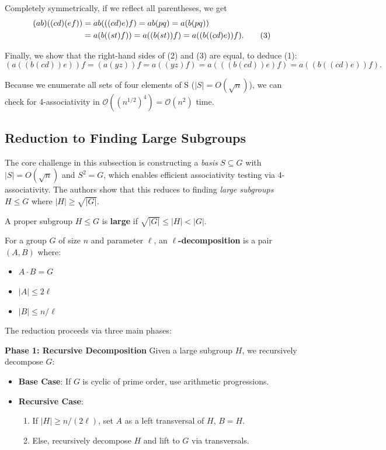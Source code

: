 \documentclass[sigconf]{acmart}
\begin{document}
Completely symmetrically, if we reflect all parentheses, we get
\begin{align}
(ab)((cd)(ef)) &= ab(((cd)e)f) = ab(pq) = a(b(pq)) \notag \\
&= a(b((st)f)) = a((b(st))f) = a((b((cd)e))f). \tag{3}
\end{align}

Finally, we show that the right-hand sides of (2) and (3) are equal, to deduce (1):
\[
(a((b(cd))e))f = (a(yz))f = a((yz)f) = a(((b(cd))e)f) = a((b((cd)e))f).
\]

Because we enumerate all sets of four elements of S ($|S| = O(\sqrt{n})$), we can check for 4-associativity in $\mathcal{O}\left((n^{1/2})^4\right) = \mathcal{O}(n^2)$ time.

\subsection{Reduction to Finding Large Subgroups}
\label{sec:large-subgroups}

The core challenge in this subsection is constructing a \emph{basis} $S \subseteq G$ with $|S| = O(\sqrt{n})$ and $S^2 = G$, which enables efficient associativity testing via 4-associativity. The authors show that this reduces to finding \emph{large subgroups} $H \leq G$ where $|H| \geq \sqrt{|G|}$.

\begin{definition}
A proper subgroup $H \leq G$ is \textbf{large} if $\sqrt{|G|} \leq |H| < |G|$.
\end{definition}

\begin{definition}
For a group $G$ of size $n$ and parameter $\ell$, an \textbf{$\ell$-decomposition} is a pair $(A,B)$ where:
\begin{itemize}
    \item $A \cdot B = G$
    \item $|A| \leq 2\ell$
    \item $|B| \leq n/\ell$
\end{itemize}
\end{definition}

The reduction proceeds via three main phases:

\textbf{Phase 1: Recursive Decomposition}
Given a large subgroup $H$, we recursively decompose $G$:
\begin{itemize}
    \item \textbf{Base Case}: If $G$ is cyclic of prime order, use arithmetic progressions.
    \item \textbf{Recursive Case}:
    \begin{enumerate}
        \item If $|H| \geq n/(2\ell)$, set $A$ as a left transversal of $H$, $B = H$.
        \item Else, recursively decompose $H$ and lift to $G$ via transversals.
    \end{enumerate}
\end{itemize}
\end{document}

